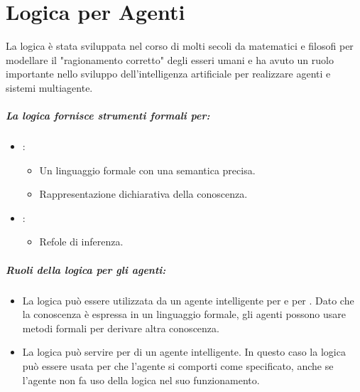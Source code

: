 \chapter{Logica per Agenti}

La logica è stata sviluppata nel corso di molti secoli da matematici e filosofi per modellare il "ragionamento corretto" degli esseri umani e ha avuto un ruolo importante nello sviluppo dell'intelligenza artificiale per realizzare agenti e sistemi multiagente.

\paragraph{La logica fornisce strumenti formali per:}

\begin{itemize}
  \item {}: 
    \begin{itemize}
      \item Un linguaggio formale con una semantica precisa. 
      \item Rappresentazione dichiarativa della conoscenza.
    \end{itemize}
  \item {}:
    \begin{itemize}
      \item Refole di inferenza.
    \end{itemize}
\end{itemize}


\paragraph{Ruoli della logica per gli agenti:}

\begin{itemize}
  \item La logica può essere utilizzata da un agente intelligente per  e per . Dato che la conoscenza è espressa in un linguaggio formale, gli agenti possono usare metodi formali per derivare altra conoscenza. 
  \item La logica può servire per  di un agente intelligente. In questo caso la logica può essere usata per  che l'agente si comporti come specificato, anche se l'agente non fa uso della logica nel suo funzionamento.
\end{itemize}


